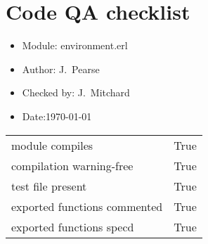 \documentclass[14pt]{article}
\begin{document}
\section*{Code QA checklist}
\Large
\begin{itemize}
\item Module: environment.erl
\item Author: J.~Pearse
\item Checked by: J.~Mitchard
\item Date:\today
\end{itemize}
\Large
\begin{tabularx}{\textwidth}{ X | X }
module compiles & True\\
compilation warning-free & True\\
test file present & True\\
exported functions commented & True\\
exported functions specd & True\\
\end{tabularx}
\end{document}
